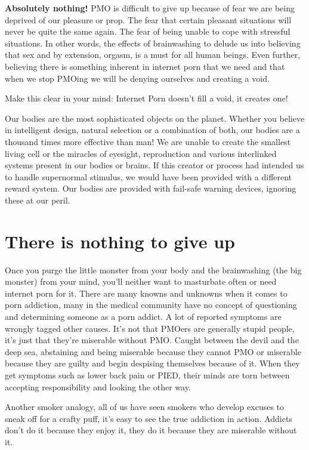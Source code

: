 \documentclass[easypeasy.tex]{subfiles}
\begin{document}
\textbf{Absolutely nothing!} PMO is difficult to give up because of fear we are being deprived of our pleasure or prop. The fear that certain pleasant situations will never be quite the same again. The fear of being unable to cope with stressful situations. In other words, the effects of brainwashing to delude us into believing that sex and by extension, orgasm, is a must for all human beings. Even further, believing there is something inherent in internet porn that we need and that when we stop PMOing we will be denying ourselves and creating a void.

Make this clear in your mind:
  {\huge Internet Porn doesn't fill a void, it creates one!}

Our bodies are the most sophisticated objects on the planet. Whether you believe in intelligent design, natural selection or a combination of both, our bodies are a thousand times more effective than man! We are unable to create the smallest living cell or the miracles of eyesight, reproduction and various interlinked systems present in our bodies or brains. If this creator or process had intended us to handle supernormal stimulus, we would have been provided with a different reward system. Our bodies are provided with fail-safe warning devices, ignoring these at our peril.

\section{There is nothing to give up}
Once you purge the little monster from your body and the brainwashing (the big monster) from your mind, you'll neither want to masturbate often or need internet porn for it. There are many knowns and unknowns when it comes to porn addiction, many in the medical community have no concept of questioning and determining someone as a porn addict. A lot of reported symptoms are wrongly tagged other causes. It's not that PMOers are generally stupid people, it's just that they're miserable without PMO. Caught between the devil and the deep sea, abstaining and being miserable because they cannot PMO or miserable because they are guilty and begin despising themselves because of it. When they get symptoms such as lower back pain or PIED, their minds are torn between accepting responsibility and looking the other way.

Another smoker analogy, all of us have seen smokers who develop excuses to sneak off for a crafty puff, it's easy to see the true addiction in action. Addicts don't do it because they enjoy it, they do it because they are miserable without it.
\end{document}
